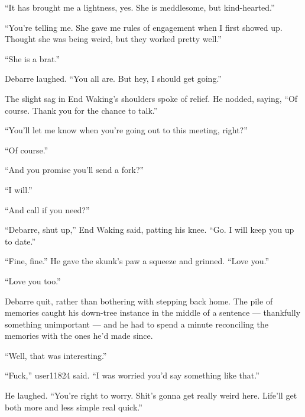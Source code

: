 ``It has brought me a lightness, yes. She is meddlesome, but kind-hearted.''

``You're telling me. She gave me rules of engagement when I first showed up. Thought she was being weird, but they worked pretty well.''

``She is a brat.''

Debarre laughed. ``You all are. But hey, I should get going.''

The slight sag in End Waking's shoulders spoke of relief. He nodded, saying, ``Of course. Thank you for the chance to talk.''

``You'll let me know when you're going out to this meeting, right?''

``Of course.''

``And you promise you'll send a fork?''

``I will.''

``And call if you need?''

``Debarre, shut up,'' End Waking said, patting his knee. ``Go. I will keep you up to date.''

``Fine, fine.'' He gave the skunk's paw a squeeze and grinned. ``Love you.''

``Love you too.''

Debarre quit, rather than bothering with stepping back home. The pile of memories caught his down-tree instance in the middle of a sentence — thankfully something unimportant — and he had to spend a minute reconciling the memories with the ones he'd made since.

``Well, that was interesting.''

``Fuck,'' user11824 said. ``I was worried you'd say something like that.''

He laughed. ``You're right to worry. Shit's gonna get really weird here. Life'll get both more and less simple real quick.''
